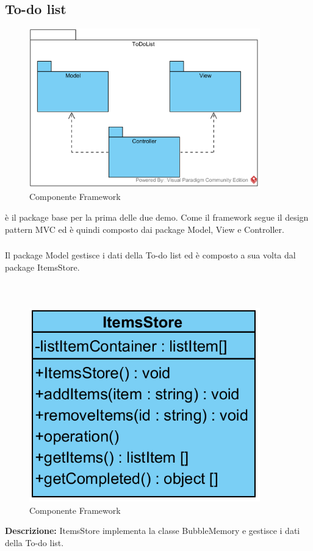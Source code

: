 \subsection{To-do list} \label{To-do list}
\begin{figure}[H]
	\centering
	\includegraphics[width=10cm]{./diagrammi/todo/todo.png}
	\caption{Componente Framework}
\end{figure}
 è il package base per la prima delle due demo. Come il framework segue il design pattern MVC ed è quindi composto dai package Model, View e Controller.

\subsubsection[::Model]{\class} \label{\class}
Il package Model gestisce i dati della To-do list ed è composto a sua volta dal package ItemsStore.


\subparagraph[::ItemsStore]{\class}\mbox{}\\ \label{\class}
\begin{figure}[H]
	\centering
	\includegraphics[width=10cm]{./diagrammi/todo/items_store.png}
	\caption{Componente Framework}
\end{figure}
\textbf{Descrizione:}
ItemsStore implementa la classe BubbleMemory e gestisce i dati della To-do list.

